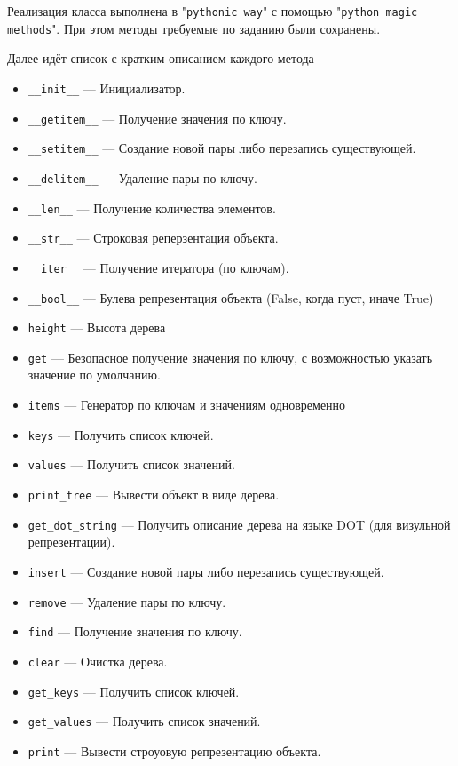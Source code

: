 Реализация класса выполнена в 
"\verb|pythonic way|" с помощью 
"\verb|python magic methods|".
При этом методы требуемые по заданию были сохранены.

Далее идёт список с кратким описанием каждого метода

\begin{itemize}
    \item \verb|__init__| --- Инициализатор.
    \item \verb|__getitem__| --- Получение значения по ключу.
    \item \verb|__setitem__| --- Создание новой пары либо перезапись существующей.
    \item \verb|__delitem__| --- Удаление пары по ключу.
    \item \verb|__len__| --- Получение количества элементов.
    \item \verb|__str__| --- Строковая реперзентация объекта.
    \item \verb|__iter__| --- Получение итератора (по ключам).
    \item \verb|__bool__| --- Булева репрезентация объекта (False, когда пуст, иначе True)
    
    \item \verb|height| --- Высота дерева
    
    \item \verb|get| --- Безопасное получение значения по ключу, с возможностью указать значение по умолчанию.
    \item \verb|items| --- Генератор по ключам и значениям одновременно
    \item \verb|keys| --- Получить список ключей.
    \item \verb|values| --- Получить список значений.
    \item \verb|print_tree| --- Вывести объект в виде дерева.
    \item \verb|get_dot_string| --- Получить описание дерева на языке DOT (для визульной репрезентации).
    
    \item \verb|insert| --- Создание новой пары либо перезапись существующей.
    \item \verb|remove| --- Удаление пары по ключу.
    \item \verb|find| --- Получение значения по ключу.
    \item \verb|clear| --- Очистка дерева.
    \item \verb|get_keys| --- Получить список ключей.
    \item \verb|get_values| --- Получить список значений.
    \item \verb|print| --- Вывести строуовую репрезентацию объекта.
    

\end{itemize}
